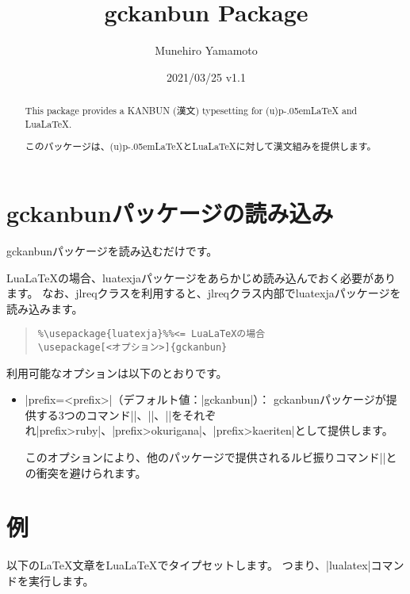 \documentclass{jlreq}\listfiles
\title{\textsf{gckanbun} Package}
\author{Munehiro Yamamoto}
\date{2021/03/25 v1.1}
\newcommand*\pLaTeX{p\kern-.05em\LaTeX}
\newcommand*\LuaLaTeX{Lua\LaTeX}
\begin{document}
\maketitle

\begin{abstract}
This package provides a KANBUN (漢文) typesetting for (u){\pLaTeX} and \LuaLaTeX.

このパッケージは、(u){\pLaTeX}と{\LuaLaTeX}に対して漢文組みを提供します。
\end{abstract}

\section{\textsf{gckanbun}パッケージの読み込み}

\textsf{gckanbun}パッケージを読み込むだけです。

{\LuaLaTeX}の場合、\textsf{luatexja}パッケージをあらかじめ読み込んでおく必要があります。
なお、\textsf{jlreq}クラスを利用すると、\textsf{jlreq}クラス内部で\textsf{luatexja}パッケージを読み込みます。

\begin{quote}
\begin{verbatim}
%\usepackage{luatexja}%%<= LuaLaTeXの場合
\usepackage[<オプション>]{gckanbun}
\end{verbatim}
\end{quote}

利用可能なオプションは以下のとおりです。
\begin{itemize}
\item |prefix=<prefix>|（デフォルト値：|gckanbun|）：
\textsf{gckanbun}パッケージが提供する3つのコマンド|\gckanbunruby|、|\gckanbunokurigana|、|\gckanbunkaeriten|をそれぞれ|\<prefix>ruby|、|\<prefix>okurigana|、|\<prefix>kaeriten|として提供します。

このオプションにより、他のパッケージで提供されるルビ振りコマンド|\ruby|との衝突を避けられます。
\end{itemize}

\section{例}

以下の{\LaTeX}文章を{\LuaLaTeX}でタイプセットします。
つまり、|lualatex|コマンドを実行します。
\end{document}
